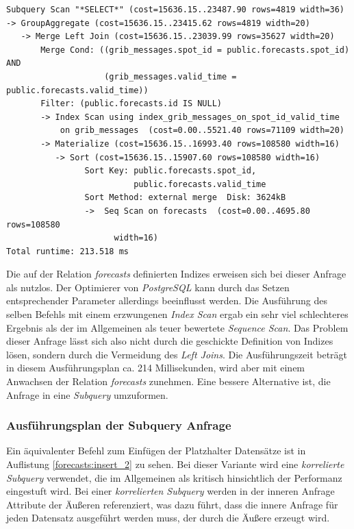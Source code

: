 \begin{lstlisting}[captionpos=b, caption=Ausführungsplan des \textit{Left Joins}, label=forecasts:explain_1]
Subquery Scan "*SELECT*" (cost=15636.15..23487.90 rows=4819 width=36) 
-> GroupAggregate (cost=15636.15..23415.62 rows=4819 width=20)
   -> Merge Left Join (cost=15636.15..23039.99 rows=35627 width=20)
       Merge Cond: ((grib_messages.spot_id = public.forecasts.spot_id) AND 
                    (grib_messages.valid_time = public.forecasts.valid_time))
       Filter: (public.forecasts.id IS NULL)
       -> Index Scan using index_grib_messages_on_spot_id_valid_time 
           on grib_messages  (cost=0.00..5521.40 rows=71109 width=20)
       -> Materialize (cost=15636.15..16993.40 rows=108580 width=16)
          -> Sort (cost=15636.15..15907.60 rows=108580 width=16)
                Sort Key: public.forecasts.spot_id, 
                          public.forecasts.valid_time
                Sort Method: external merge  Disk: 3624kB
                ->  Seq Scan on forecasts  (cost=0.00..4695.80 rows=108580 
                      width=16)
Total runtime: 213.518 ms
\end{lstlisting}

Die auf der Relation \textit{forecasts} definierten Indizes erweisen
sich bei dieser Anfrage als nutzlos. Der Optimierer von
\textit{PostgreSQL} kann durch das Setzen entsprechender Parameter
allerdings beeinflusst werden. Die Ausführung des selben Befehls mit
einem erzwungenen \textit{Index Scan} ergab ein sehr viel schlechteres
Ergebnis als der im Allgemeinen als teuer bewertete \textit{Sequence
  Scan}. Das Problem dieser Anfrage lässt sich also nicht durch die
geschickte Definition von Indizes lösen, sondern durch die Vermeidung
des \textit{Left Joins}. Die Ausführungszeit beträgt in diesem
Ausführungsplan ca. 214 Millisekunden, wird aber mit einem Anwachsen
der Relation \textit{forecasts} zunehmen. Eine bessere Alternative
ist, die Anfrage in eine \textit{Subquery} umzuformen.

\subsubsection{Ausführungsplan der Subquery Anfrage}
Ein äquivalenter Befehl zum Einfügen der Platzhalter Datensätze ist in
Auflistung \ref{forecasts:insert_2} zu sehen. Bei dieser Variante wird
eine \textit{korrelierte Subquery} verwendet, die im Allgemeinen als
kritisch hinsichtlich der Performanz eingestuft wird. Bei einer
\textit{korrelierten Subquery} werden in der inneren Anfrage Attribute
der Äußeren referenziert, was dazu führt, dass die innere Anfrage für
jeden Datensatz ausgeführt werden muss, der durch die Äußere erzeugt
wird.

